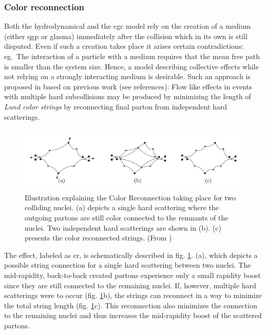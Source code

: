 \subsubsection{Color reconnection}
\label{sec:CR}
Both the hydrodynamical and the \gls{cgc} model rely on the creation of a medium (either \gls{qgp} or glasma) immediately after the collision which in its own is still disputed. Even if such a creation takes place it arises certain contradictions: eg.\ The interaction of a particle with a medium requires that the mean free path is smaller than the system size. Hence, a model describing collective effects while not relying on a strongly interacting medium is desirable. Such an approach is proposed in \cite{Ortiz2013} based on previous work (see references): Flow like effects in events with multiple hard subcollisions may be produced by minimizing the length of \emph{Lund color strings} by reconnecting final parton from independent hard scatterings. 
\begin{figure}
  \centering
  \includegraphics[width=.8\textwidth]{figures/CR.png}
  \caption[Illustration explaining the Color Reconnection taking place for two colliding nuclei.]{Illustration explaining the Color Reconnection taking place for two colliding nuclei. (a) depicts a single hard scattering where the outgoing partons are still color connected to the remnants of the nuclei. Two independent hard scatterings are shown in (b). (c) presents the color reconnected strings. (From \cite{Gustafson2009})}
  \label{fig:cr}
\end{figure}

The effect, labeled as \gls{cr}, is schematically described in fig. \ref{fig:cr}. (a), which depicts a possible string connection for a single hard scattering between two nuclei. The mid-rapidity, back-to-back created partons experience only a small rapidity boost since they are still connected to the remaining nuclei. If, however, multiple hard scatterings were to occur (fig. \ref{fig:cr}b), the strings can  reconnect in a way to minimize the total string length (fig. \ref{fig:cr}c). This reconnection also minimizes the connection to the remaining nuclei and thus increases the mid-rapidity boost of the scattered partons.\\

